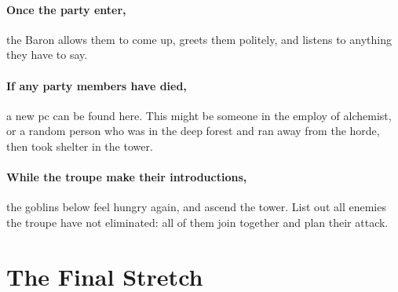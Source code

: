 \begin{multicols}{2}
\theAlchemist

\paragraph{Once the party enter,}
the Baron allows them to come up, greets them politely, and listens to anything they have to say.

\paragraph{If any party members have died,}
a new \gls{pc} can be found here.
This might be someone in the employ of \gls{alchemist}, or a random person who was in the deep forest and ran away from the horde, then took shelter in the tower.

\paragraph{While the troupe make their introductions,}
the goblins below feel hungry again, and ascend the tower.
List out all enemies the troupe have not eliminated: all of them join together and plan their attack.

\end{multicols}

\section{The Final Stretch}

